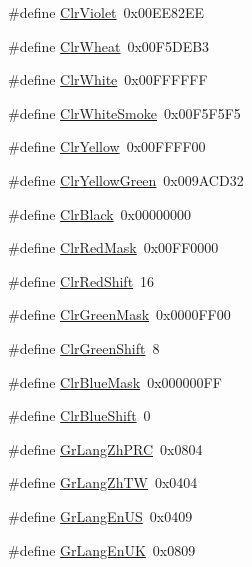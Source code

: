 \begin{DoxyCompactItemize}
\item 
\#define \hyperlink{group__primitives__api_ga9c1d987dadd94a4d66d15622ebb1525a}{Clr\+Violet}~0x00\+E\+E82\+E\+E
\item 
\#define \hyperlink{group__primitives__api_ga71e6ab49142949e32cc59639d257358f}{Clr\+Wheat}~0x00\+F5\+D\+E\+B3
\item 
\#define \hyperlink{group__primitives__api_ga3ea1ba6c922e4e52d2b7994715baed57}{Clr\+White}~0x00\+F\+F\+F\+F\+F\+F
\item 
\#define \hyperlink{group__primitives__api_ga939fde3f953e1fe47be34cafd6640b06}{Clr\+White\+Smoke}~0x00\+F5\+F5\+F5
\item 
\#define \hyperlink{group__primitives__api_gaea4d0baab30b6e27b877a0492744c9eb}{Clr\+Yellow}~0x00\+F\+F\+F\+F00
\item 
\#define \hyperlink{group__primitives__api_ga942a8ebeb8f564c51a766f35198189ea}{Clr\+Yellow\+Green}~0x009\+A\+C\+D32
\item 
\#define \hyperlink{group__primitives__api_gae68bd8966702128d6463b92d24b5b66b}{Clr\+Black}~0x00000000
\item 
\#define \hyperlink{group__primitives__api_gace856442fed5c85c0295a2352be5cd08}{Clr\+Red\+Mask}~0x00\+F\+F0000
\item 
\#define \hyperlink{group__primitives__api_gaeebcd53b09038e0907494561a5e2bd3a}{Clr\+Red\+Shift}~16
\item 
\#define \hyperlink{group__primitives__api_ga2ac237f9978590bc3f1f6d76afe1893b}{Clr\+Green\+Mask}~0x0000\+F\+F00
\item 
\#define \hyperlink{group__primitives__api_ga6fd564602c2d88c20e8e1d1a1a0299bf}{Clr\+Green\+Shift}~8
\item 
\#define \hyperlink{group__primitives__api_gabaac345e1df907e7135728930e8ee723}{Clr\+Blue\+Mask}~0x000000\+F\+F
\item 
\#define \hyperlink{group__primitives__api_gab1719411d0a5bc48897a76b324831a47}{Clr\+Blue\+Shift}~0
\item 
\#define \hyperlink{group__primitives__api_gaf81ca32b126129752da910d2efd7c1c9}{Gr\+Lang\+Zh\+P\+R\+C}~0x0804
\item 
\#define \hyperlink{group__primitives__api_gaa9fb7454b95cd706cf17cc1fd0620a67}{Gr\+Lang\+Zh\+T\+W}~0x0404
\item 
\#define \hyperlink{group__primitives__api_ga53d1db1de0716aa2d4c98054756ca315}{Gr\+Lang\+En\+U\+S}~0x0409
\item 
\#define \hyperlink{group__primitives__api_ga957249bfe4d9ae7466663246596d9722}{Gr\+Lang\+En\+U\+K}~0x0809

\end{DoxyCompactItemize}
